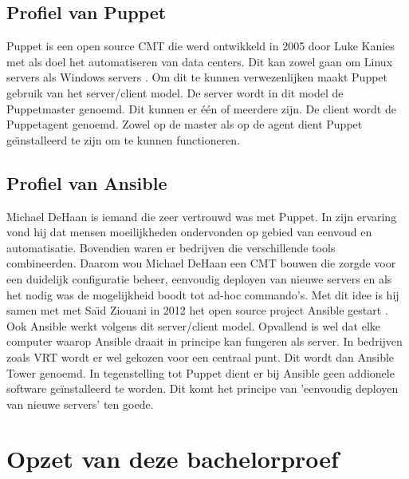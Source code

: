 \subsection{Profiel van Puppet}
Puppet is een open source CMT die werd ontwikkeld in 2005 door Luke Kanies \autocite{PuppetLeaders} met als doel het automatiseren van data centers. Dit kan zowel gaan om Linux servers als Windows servers \autocite{PuppetForWindows}. Om dit te kunnen verwezenlijken maakt Puppet gebruik van  het server/client model. De server wordt in dit model de Puppetmaster genoemd. Dit kunnen er  \'e\'en of meerdere zijn.  De client wordt de Puppetagent genoemd. Zowel op de master als op de agent dient Puppet ge{\"\i}nstalleerd te zijn om te kunnen functioneren. \autocite{Puppetdoc} \autocite{puppetfaq}


\subsection{Profiel van Ansible}
Michael DeHaan is iemand die zeer vertrouwd was met Puppet. In zijn ervaring vond hij dat mensen moeilijkheden ondervonden op gebied van eenvoud en automatisatie. Bovendien waren er bedrijven die verschillende tools combineerden. Daarom wou Michael DeHaan een CMT bouwen die zorgde voor een duidelijk configuratie beheer, eenvoudig deployen van nieuwe servers en als het nodig was de mogelijkheid boodt tot ad-hoc commando's. Met dit idee is hij samen met met Sa{\"\i}d Ziouani in 2012 het open source project Ansible gestart \autocite{ansiblefordevops}. Ook Ansible werkt volgens dit server/client model. Opvallend is wel dat elke computer waarop Ansible draait in principe kan fungeren als server. In bedrijven zoals VRT wordt er wel gekozen voor een centraal punt. Dit wordt dan Ansible Tower genoemd. In tegenstelling tot Puppet dient er bij Ansible geen addionele software ge\"installeerd te worden. Dit komt het principe van 'eenvoudig deployen van nieuwe servers' ten goede.









\section{Opzet van deze bachelorproef}
\label{sec:opzet-bachelorproef}

